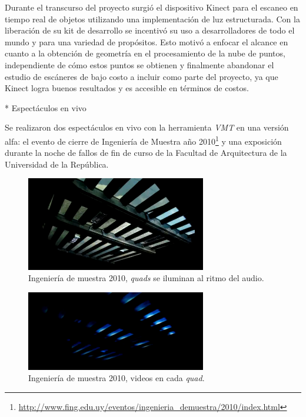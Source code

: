 Durante el transcurso del proyecto surgió el dispositivo Kinect para el escaneo en tiempo real de objetos utilizando una implementación de luz estructurada. Con la liberación de su kit de desarrollo se incentivó su uso a desarrolladores de todo el mundo y para una variedad de propósitos. Esto motivó a enfocar el alcance en cuanto a la obtención de geometría en el procesamiento de la nube de puntos, independiente de cómo estos puntos se obtienen y finalmente abandonar el estudio de escáneres de bajo costo a incluir como parte del proyecto, ya que Kinect logra buenos resultados y es accesible en términos de costos.

* Espectáculos en vivo

Se realizaron dos espectáculos en vivo con la herramienta \emph{VMT} en una versión alfa: el evento de cierre de Ingeniería de Muestra año 2010\footnote{\url{http://www.fing.edu.uy/eventos/ingenieria_demuestra/2010/index.html}} y una exposición durante la noche de fallos de fin de curso de la Facultad de Arquitectura de la Universidad de la República.
\begin{figure}[H]
  \centering
    \includegraphics[width=0.7\textwidth]{./Cap7_conclusiones/ingMuestra1.png}
  \caption[Ingeniería de muestra 2010, \emph{quads} se iluminan al ritmo del audio.]{Ingeniería de muestra 2010, \emph{quads} se iluminan al ritmo del audio.}
  \label{fig:ingMuestra1}
\end{figure}
\begin{figure}[H]
  \centering
    \includegraphics[width=0.7\textwidth]{./Cap7_conclusiones/ingMuestra2.png}
  \caption[Ingeniería de muestra 2010, videos en cada \emph{quad}.]{Ingeniería de muestra 2010, videos en cada \emph{quad}.}
  \label{fig:ingMuestra2}
\end{figure}

